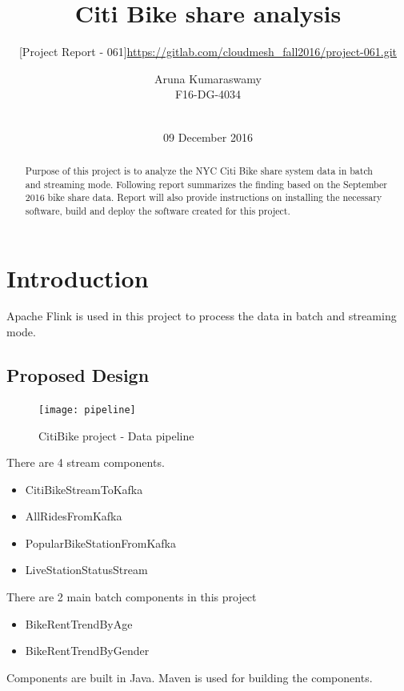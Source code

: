 \documentclass{sig-alternate-05-2015}
\begin{document}
\title{Citi Bike share analysis}  
\subtitle{[Project Report - 061]}
\subtitle{\url{https://gitlab.com/cloudmesh_fall2016/project-061.git}}


\author{
\alignauthor
Aruna Kumaraswamy\\
F16-DG-4034\\
       \\
}
\date{09 December 2016}

\maketitle

\begin{abstract}
    Purpose of this project is to analyze the NYC Citi Bike share system data in batch and streaming mode. Following report summarizes the finding based on the September 2016 bike share data. Report will also provide instructions on installing the necessary software, build and deploy the software created for this project.    
\end{abstract}


\section{Introduction}
Apache Flink is used in this project to process the data in batch and streaming mode. 

\subsection{Proposed Design}
\begin{figure}[!ht]
\texttt{[image: pipeline]}
 \caption{CitiBike project - Data pipeline}\label{F:small}
\end{figure}

There are 4 stream components.
\begin{itemize}
    \item CitiBikeStreamToKafka
    \item AllRidesFromKafka
    \item PopularBikeStationFromKafka
    \item LiveStationStatusStream
\end{itemize}
\break
There are 2 main batch components in this project
\begin{itemize}
    \item BikeRentTrendByAge
    \item BikeRentTrendByGender
\end{itemize}
Components are built in Java. Maven is used for building the components.
\end{document}
